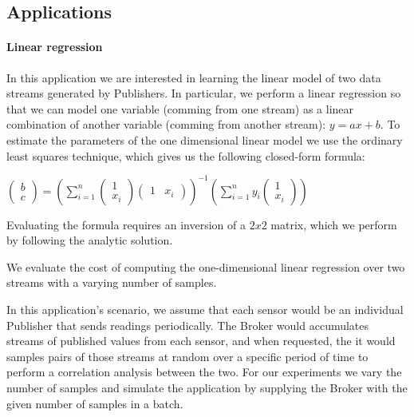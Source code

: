 \subsection{Applications}

\paragraph{Linear regression}



In this application we are interested in learning the linear model of two data
streams generated by Publishers.  In particular, we perform a linear regression
so that we can model one variable (comming from one stream) as a linear
combination of another variable (comming from another stream): $y = ax + b$.
To estimate the parameters of the one dimensional linear model we use the
ordinary least squares technique, which gives us the following closed-form
formula:

$\begin{pmatrix} b \\ c \end{pmatrix} =
\left( \displaystyle\sum_{i=1}^n \begin{pmatrix} 1 \\ x_i \end{pmatrix}
  \begin{pmatrix} 1 & x_i\end{pmatrix}\right)^{-1}
\left( \displaystyle\sum_{i=1}^n y_i \begin{pmatrix} 1 \\ x_i \end{pmatrix}\right)$

Evaluating the formula requires an inversion of a $2 x 2$ matrix, which we perform
by following the analytic solution.

We evaluate the cost of computing the one-dimensional linear regression over
two streams with a varying number of samples.

In this application's scenario, we assume that each sensor would be an
individual Publisher that sends readings periodically.  The Broker would
accumulates streams of published values from each sensor, and when requested,
the it would samples pairs of those streams at random over a specific period of
time to perform a correlation analysis between the two.  For our experiments we
vary the number of samples and simulate the application by supplying the Broker
with the given number of samples in a batch.

